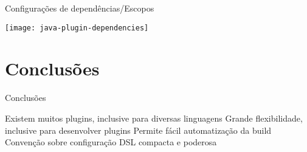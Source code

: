 \documentclass{beamer}
\begin{document}
\begin{frame}{Configurações de dependências/Escopos}
  \begin{center}
    \texttt{[image: java-plugin-dependencies]}
  \end{center}
\end{frame}

\section{Conclusões}

\begin{frame}{Conclusões}
 \begin{outline}
    Existem \alert{muitos plugins}, inclusive para diversas linguagens
    Grande \alert{flexibilidade}, inclusive para desenvolver plugins
    Permite fácil \alert{automatização} da build
    \alert{Convenção} sobre configuração
    \alert{DSL} compacta e poderosa
 \end{outline}
\end{frame}
\end{document}
